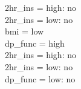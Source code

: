 \documentclass[12pt]{article}
\begin{document}
\textbar\quad \textbar\quad \textbar\quad \textbar\quad 2hr\_ins = high: no\\
\textbar\quad \textbar\quad \textbar\quad \textbar\quad 2hr\_ins = low: no\\
\textbar\quad \textbar\quad bmi = low\\
\textbar\quad \textbar\quad \textbar\quad dp\_func = high\\
\textbar\quad \textbar\quad \textbar\quad \textbar\quad 2hr\_ins = high: no\\
\textbar\quad \textbar\quad \textbar\quad \textbar\quad 2hr\_ins = low: no\\
\textbar\quad \textbar\quad \textbar\quad dp\_func = low: no\\
\end{document}
